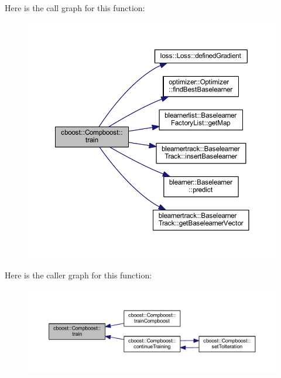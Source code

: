 Here is the call graph for this function\+:\nopagebreak
\begin{figure}[H]
\begin{center}
\leavevmode
\includegraphics[width=350pt]{classcboost_1_1_compboost_aa898572eb2c83e0b95c12788a859333b_cgraph}
\end{center}
\end{figure}
Here is the caller graph for this function\+:\nopagebreak
\begin{figure}[H]
\begin{center}
\leavevmode
\includegraphics[width=350pt]{classcboost_1_1_compboost_aa898572eb2c83e0b95c12788a859333b_icgraph}
\end{center}
\end{figure}
\mbox{\label{classcboost_1_1_compboost_a52ea04dec53c68865fdc4a79461d17cb}} 
